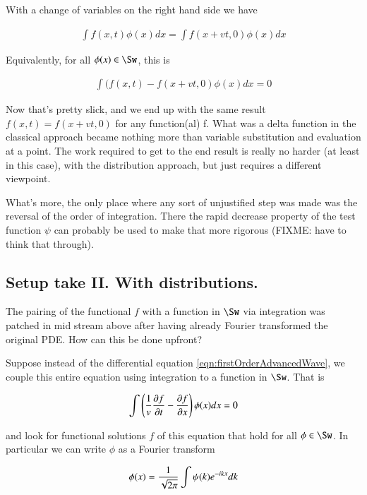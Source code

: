 With a change of variables on the right hand side we have

\begin{align*}
\int f(x,t) \phi(x) dx = \int f(x + vt,0) \phi(x) dx
\end{align*}

Equivalently, for all $\phi(x) \in \Sw$, this is

\begin{align*}
\int (f(x,t) - f(x + vt, 0) \phi(x) dx = 0
\end{align*}

Now that's pretty slick, and we end up with the same result $f(x,t) = f(x + vt, 0)$ for any function(al) f.
What was a delta function in the classical approach became nothing more than variable substitution and evaluation at a point.  The work required to get to the end result
is really no harder (at least in this case), with the distribution approach, but just requires a different viewpoint.

What's more, the only place where
any sort of unjustified step was made was the reversal of the order of integration.  There the rapid decrease property of the test function $\psi$ can probably be used
to make that more rigorous (FIXME: have to think that through).

\subsection{Setup take II.  With distributions. }

The pairing of the functional $f$ with a function in $\Sw$ via integration was patched in mid stream above after having already Fourier transformed the original PDE.
How can this be done upfront?

Suppose instead of the differential equation \ref{eqn:firstOrderAdvancedWave}, we couple this entire equation using integration to a function in $\Sw$.  That is

\begin{align*}
\int \left( \inv{v} \PD{t}{f} - \PD{x}{f} \right) \phi(x) dx = 0
\end{align*}

and look for functional solutions $f$ of this equation that hold for all $\phi \in \Sw$.  In particular we can write $\phi$ as a Fourier transform

\begin{align*}
\phi(x) = \inv{\sqrt{2\pi}} \int \psi(k) e^{-i k x} dk
\end{align*}

